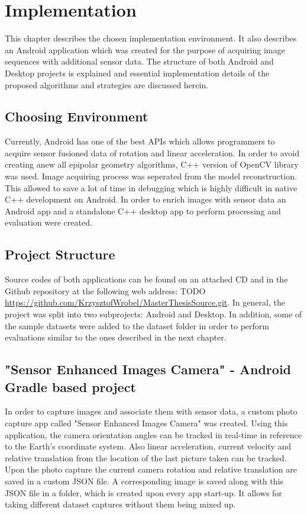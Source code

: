 \ifpdf
    \graphicspath{{figures/}{figures/comparisons}}
\else
    \graphicspath{{figures/}{figures/comparisons}}
\fi

\chapter{Implementation} %
This chapter describes the chosen implementation environment. It also describes an Android application which was created for the purpose of acquiring image sequences with additional sensor data. The structure of both Android and Desktop projects is explained and essential implementation details of the proposed algorithms and strategies are discussed herein.
\section{Choosing Environment}
Currently, Android has one of the best APIs which allows programmers to acquire sensor fusioned data of rotation and linear acceleration.
In order to avoid creating anew all epipolar geometry algorithms, C++ version of OpenCV library was used. Image acquiring process was seperated from the model reconstruction. This allowed to save a lot of time in debugging which is highly difficult in native C++ development on Android. In order to enrich images with sensor data an Android app and a standalone C++ desktop app to perform processing and evaluation were created.
\section{Project Structure} \label{sec:ProjectStructure}
Source codes of both applications can be found on an attached CD and in the Github repository at the following web address: TODO \url{https://github.com/KrzysztofWrobel/MasterThesisSource.git}. In general, the project was split into two subprojects: Android and Desktop. In addition, some of the sample datasets were added to the dataset folder in order to perform evaluations similar to the ones described in the next chapter.
\section{"Sensor Enhanced Images Camera" - Android Gradle based project}
In order to capture images and associate them with sensor data, a custom photo capture app called "Sensor Enhanced Images Camera" was created.
Using this application, the camera orientation angles can be tracked in real-time in reference to the Earth's coordinate system. Also linear acceleration, current velocity and relative translation from the location of the last picture taken can be tracked. 
Upon the photo capture the current camera rotation and relative translation are saved in a custom JSON file. A corresponding image is saved along with this JSON file in a folder, which is created upon every app start-up. It allows for taking different dataset captures without them being mixed up.
